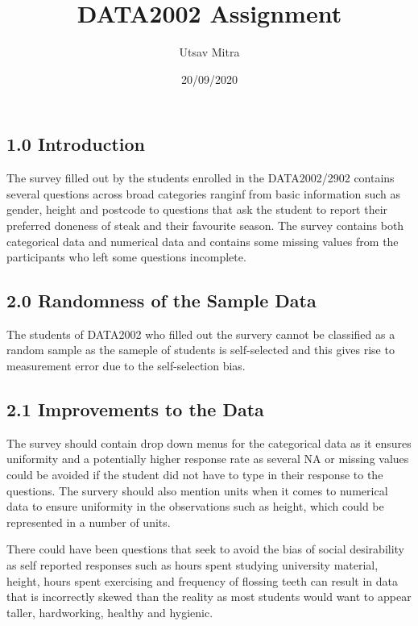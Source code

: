 \documentclass[
]{article}
\title{DATA2002 Assignment}
\author{Utsav Mitra}
\date{20/09/2020}
\begin{document}
\maketitle

{
\setcounter{tocdepth}{2}
\tableofcontents
}
\hypertarget{introduction}{%
\subsection{1.0 Introduction}\label{introduction}}

The survey filled out by the students enrolled in the DATA2002/2902
contains several questions across broad categories ranginf from basic
information such as gender, height and postcode to questions that ask
the student to report their preferred doneness of steak and their
favourite season. The survey contains both categorical data and
numerical data and contains some missing values from the participants
who left some questions incomplete.

\hypertarget{randomness-of-the-sample-data}{%
\subsection{2.0 Randomness of the Sample
Data}\label{randomness-of-the-sample-data}}

The students of DATA2002 who filled out the survery cannot be classified
as a random sample as the sameple of students is self-selected and this
gives rise to measurement error due to the self-selection bias.

\hypertarget{improvements-to-the-data}{%
\subsection{2.1 Improvements to the
Data}\label{improvements-to-the-data}}

The survey should contain drop down menus for the categorical data as it
ensures uniformity and a potentially higher response rate as several NA
or missing values could be avoided if the student did not have to type
in their response to the questions. The survery should also mention
units when it comes to numerical data to ensure uniformity in the
observations such as height, which could be represented in a number of
units.

There could have been questions that seek to avoid the bias of social
desirability as self reported responses such as hours spent studying
university material, height, hours spent exercising and frequency of
flossing teeth can result in data that is incorrectly skewed than the
reality as most students would want to appear taller, hardworking,
healthy and hygienic.
\end{document}
